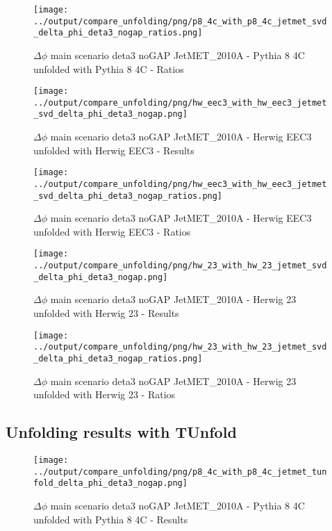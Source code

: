 \documentclass[11pt]{book}
\begin{document}
\begin{figure}[ht]
\centering
\texttt{[image: ../output/compare\_unfolding/png/p8\_4c\_with\_p8\_4c\_jetmet\_svd\_delta\_phi\_deta3\_nogap\_ratios.png]}
\caption{$\Delta\phi$ main scenario deta3 noGAP JetMET\_2010A - Pythia 8 4C unfolded with Pythia 8 4C - Ratios}
\label{p8_p8_jetmet_svd_delta_phi_deta3_nogap_b}
\end{figure}

\begin{figure}[ht]
\centering
\texttt{[image: ../output/compare\_unfolding/png/hw\_eec3\_with\_hw\_eec3\_jetmet\_svd\_delta\_phi\_deta3\_nogap.png]}
\caption{$\Delta\phi$ main scenario deta3 noGAP JetMET\_2010A - Herwig EEC3 unfolded with Herwig EEC3 - Results}
\label{hw_eec3_hw_eec3_jetmet_svd_delta_phi_deta3_nogap_a}
\end{figure}

\begin{figure}[ht]
\centering
\texttt{[image: ../output/compare\_unfolding/png/hw\_eec3\_with\_hw\_eec3\_jetmet\_svd\_delta\_phi\_deta3\_nogap\_ratios.png]}
\caption{$\Delta\phi$ main scenario deta3 noGAP JetMET\_2010A - Herwig EEC3 unfolded with Herwig EEC3 - Ratios}
\label{hw_eec3_hw_eec3_jetmet_svd_delta_phi_deta3_nogap_b}
\end{figure}

\begin{figure}[ht]
\centering
\texttt{[image: ../output/compare\_unfolding/png/hw\_23\_with\_hw\_23\_jetmet\_svd\_delta\_phi\_deta3\_nogap.png]}
\caption{$\Delta\phi$ main scenario deta3 noGAP JetMET\_2010A - Herwig 23 unfolded with Herwig 23 - Results}
\label{hw_23_hw_23_jetmet_svd_delta_phi_deta3_nogap_a}
\end{figure}

\begin{figure}[ht]
\centering
\texttt{[image: ../output/compare\_unfolding/png/hw\_23\_with\_hw\_23\_jetmet\_svd\_delta\_phi\_deta3\_nogap\_ratios.png]}
\caption{$\Delta\phi$ main scenario deta3 noGAP JetMET\_2010A - Herwig 23 unfolded with Herwig 23 - Ratios}
\label{hw_23_hw_23_jetmet_svd_delta_phi_deta3_nogap_b}
\end{figure}


\clearpage
\subsection{Unfolding results with TUnfold}

\begin{figure}[ht]
\centering
\texttt{[image: ../output/compare\_unfolding/png/p8\_4c\_with\_p8\_4c\_jetmet\_tunfold\_delta\_phi\_deta3\_nogap.png]}
\caption{$\Delta\phi$ main scenario deta3 noGAP JetMET\_2010A - Pythia 8 4C unfolded with Pythia 8 4C - Results}
\label{p8_p8_jetmet_tunfold_delta_phi_deta3_nogap_a}
\end{figure}
\end{document}
